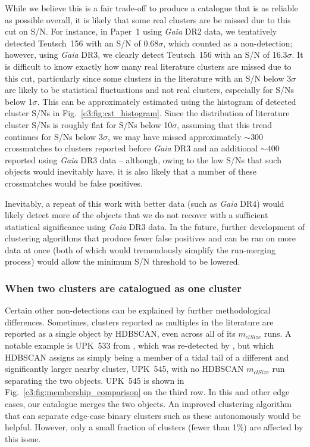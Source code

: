 While we believe this is a fair trade-off to produce a catalogue that is as reliable as possible overall, it is likely that some real clusters are be missed due to this cut on S/N. For instance, in Paper~1 using \emph{Gaia} DR2 data, we tentatively detected Teutsch~156 with an S/N of 0.68$\sigma$, which counted as a non-detection; however, using \emph{Gaia} DR3, we clearly detect Teutsch~156 with an S/N of 16.3$\sigma$. It is difficult to know exactly how many real literature clusters are missed due to this cut, particularly since some clusters in the literature with an S/N below 3$\sigma$ are likely to be statistical fluctuations and not real clusters, especially for S/Ns below 1$\sigma$. This can be approximately estimated using the histogram of detected cluster S/Ns in Fig.~\ref{c3:fig:cst_histogram}. Since the distribution of literature cluster S/Ns is roughly flat for S/Ns below 10$\sigma$, assuming that this trend continues for S/Ns below 3$\sigma$, we may have missed approximately $\sim 300$ crossmatches to clusters reported before \emph{Gaia} DR3 and an additional $\sim 400$ reported using \emph{Gaia} DR3 data -- although, owing to the low S/Ns that such objects would inevitably have, it is also likely that a number of these crossmatches would be false positives.

Inevitably, a repeat of this work with better data (such as \emph{Gaia} DR4) would likely detect more of the objects that we do not recover with a sufficient statistical significance using \emph{Gaia} DR3 data. In the future, further development of clustering algorithms that produce fewer false positives and can be ran on more data at once (both of which would tremendously simplify the run-merging process) would allow the minimum S/N threshold to be lowered.

\subsubsection{When two clusters are catalogued as one cluster}\label{c3:sec:discussion-undetected:methodological-reasons:3-two-in-one}

Certain other non-detections can be explained by further methodological differences. Sometimes, clusters reported as multiples in the literature are reported as a single object by HDBSCAN, even across all of its $m_{clSize}$ runs. A notable example is UPK~533 from \cite{sim_207_2019}, which was re-detected by \cite{cantat-gaudin_clusters_2020}, but which HDBSCAN assigns as simply being a member of a tidal tail of a different and significantly larger nearby cluster, UPK~545, with no HDBSCAN $m_{clSize}$ run separating the two objects. UPK~545 is shown in Fig.~\ref{c3:fig:membership_comparison} on the third row. In this and other edge cases, our catalogue merges the two objects. An improved clustering algorithm that can separate edge-case binary clusters such as these autonomously would be helpful. However, only a small fraction of clusters (fewer than 1\%) are affected by this issue.

